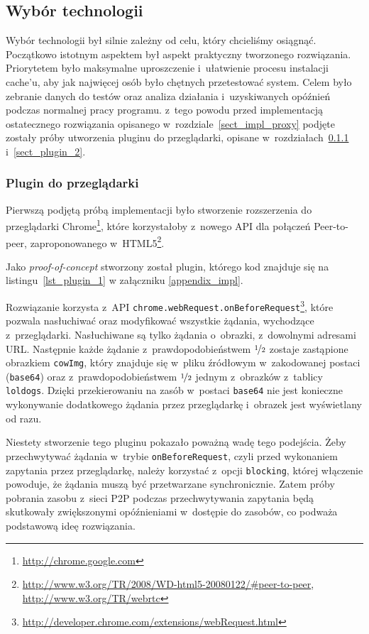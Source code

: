 \documentclass[a4paper,11pt]{scrartcl}
\newcommand{\f}{\texttt}
\newcommand{\keszu}{cache'u}
\begin{document}
\subsection{Wybór technologii}
\label{sect_impl_technology}
Wybór technologii był silnie zależny od celu, który chcieliśmy osiągnąć. Początkowo istotnym aspektem był aspekt praktyczny tworzonego rozwiązania. Priorytetem było maksymalne uproszczenie i~ułatwienie procesu instalacji \keszu, aby jak najwięcej osób było chętnych przetestować system. Celem było zebranie danych do testów oraz analiza działania i~uzyskiwanych opóźnień podczas normalnej pracy programu. z~tego powodu przed implementacją ostatecznego rozwiązania opisanego w~rozdziale~\ref{sect_impl_proxy} podjęte zostały próby utworzenia pluginu do przeglądarki, opisane w~rozdziałach~\ref{sect_plugin_1} i~\ref{sect_plugin_2}.

\subsubsection{Plugin do przeglądarki}
\label{sect_plugin_1}
Pierwszą podjętą próbą implementacji było stworzenie rozszerzenia do przeglądarki Chrome\footnote{\url{http://chrome.google.com}}, które korzystałoby z~nowego API dla połączeń Peer-to-peer, zaproponowanego w~HTML5\footnote{\url{http://www.w3.org/TR/2008/WD-html5-20080122/#peer-to-peer}, \url{http://www.w3.org/TR/webrtc}}.

Jako \textit{proof-of-concept} stworzony został plugin, którego kod znajduje się na listingu~\ref{lst_plugin_1} w załączniku \ref{appendix_impl}.

Rozwiązanie korzysta z~API \f{chrome.webRequest.onBeforeRequest}\footnote{\url{http://developer.chrome.com/extensions/webRequest.html}}, które pozwala nasłuchiwać oraz modyfikować wszystkie żądania, wychodzące z~przeglądarki. Nasłuchiwane są tylko żądania o~obrazki, z~dowolnymi adresami URL. Następnie każde żądanie z~prawdopodobieństwem $\nicefrac{1}{2}$ zostaje zastąpione obrazkiem \f{cowImg}, który znajduje się w~pliku źródłowym w~zakodowanej postaci (\f{base64}) oraz z~prawdopodobieństwem $\nicefrac{1}{2}$ jednym z~obrazków z~tablicy \f{loldogs}. Dzięki przekierowaniu na zasób w~postaci \f{base64} nie jest konieczne wykonywanie dodatkowego żądania przez przeglądarkę i~obrazek jest wyświetlany od razu. 

Niestety stworzenie tego pluginu pokazało poważną wadę tego podejścia. Żeby przechwytywać żądania w~trybie \f{onBeforeRequest}, czyli przed wykonaniem zapytania przez przeglądarkę, należy korzystać z~opcji \f{blocking}, której włączenie powoduje, że żądania muszą być przetwarzane synchronicznie. Zatem próby pobrania zasobu z~sieci P2P podczas przechwytywania zapytania będą skutkowały zwiększonymi opóźnieniami w~dostępie do zasobów, co podważa podstawową ideę rozwiązania.
\end{document}
